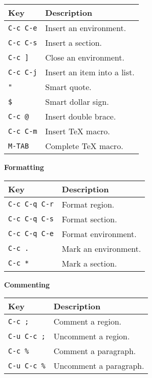 \documentclass{article}
\begin{document}
\noindent
\begin{tabular}{p{\firstcol}p{\secondcol}}
\hline
\textbf{Key} & \textbf{Description}\\
\hline
\texttt{C-c C-e}
& Insert an environment.\\
\texttt{C-c C-s}
& Insert a section.\\
\texttt{C-c ]}
& Close an environment.\\
\texttt{C-c C-j}
& Insert an item into a list.\\
\texttt{"}
& Smart quote.\\
\texttt{\$}
& Smart dollar sign.\\
\texttt{C-c @}
& Insert double brace.\\
\texttt{C-c C-m}
& Insert \TeX{} macro.\\
\texttt{M-TAB}
& Complete \TeX{} macro.\\
\end{tabular}

\smallskip

\noindent
\textbf{Formatting}

\smallskip

\noindent
\begin{tabular}{p{\firstcol}p{\secondcol}}
\hline
\textbf{Key} & \textbf{Description}\\
\hline
\texttt{C-c C-q C-r}
& Format region.\\
\texttt{C-c C-q C-s}
& Format section.\\
\texttt{C-c C-q C-e}
& Format environment.\\
\texttt{C-c .}
& Mark an environment.\\
\texttt{C-c *}
& Mark a section.
\end{tabular}

\smallskip

\noindent
\textbf{Commenting}

\smallskip

\noindent
\begin{tabular}{p{\firstcol}p{\secondcol}}
\hline
\textbf{Key} & \textbf{Description}\\
\hline
\texttt{C-c ;}
& Comment a region.\\
\texttt{C-u C-c ;}
& Uncomment a region.\\
\texttt{C-c \%}
& Comment a paragraph.\\
\texttt{C-u C-c \%}
& Uncomment a paragraph.
\end{tabular}

\smallskip
\end{document}
